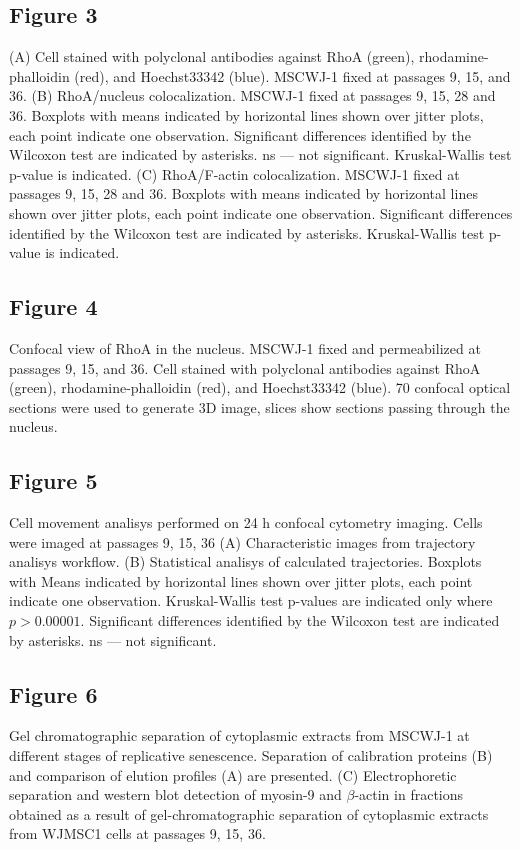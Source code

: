 \documentclass[alpha-refs]{wiley-article}
\begin{document}
\subsection*{Figure 3}
(A) Cell stained with polyclonal antibodies against RhoA (green), rhodamine-phalloidin (red), and Hoechst33342 (blue).
MSCWJ-1 fixed at passages 9, 15, and 36.
(B) RhoA/nucleus colocalization. MSCWJ-1 fixed at passages 9, 15, 28 and 36.
Boxplots with means indicated by horizontal lines shown over jitter plots, each point indicate one observation.
Significant differences identified by the Wilcoxon test are indicated by asterisks.
ns --- not significant.
Kruskal-Wallis test p-value is indicated.
(C) RhoA/F-actin colocalization. MSCWJ-1 fixed at passages 9, 15, 28 and 36.
Boxplots with means indicated by horizontal lines shown over jitter plots, each point indicate one observation.
Significant differences identified by the Wilcoxon test are indicated by asterisks.
Kruskal-Wallis test p-value is indicated.

\subsection*{Figure 4}
Confocal view of RhoA in the nucleus.
MSCWJ-1 fixed and permeabilized at passages 9, 15, and 36.
Cell stained with polyclonal antibodies against RhoA (green), rhodamine-phalloidin (red), and Hoechst33342 (blue).
70 confocal optical sections were used to generate 3D image, slices show sections passing through the nucleus.

\subsection*{Figure 5}
Cell movement analisys performed on 24 h confocal cytometry imaging.
Cells were imaged at passages 9, 15, 36 (A) Characteristic images from trajectory analisys workflow.
(B) Statistical analisys of calculated trajectories.
Boxplots with Means indicated by horizontal lines shown over jitter plots, each point indicate one observation.
Kruskal-Wallis test p-values are indicated only where $p > 0.00001$.
Significant differences identified by the Wilcoxon test are indicated by asterisks.
ns --- not significant.

\subsection*{Figure 6}
Gel chromatographic separation of cytoplasmic extracts from MSCWJ-1 at different stages of replicative senescence.
Separation of calibration proteins (B) and comparison of elution profiles (A) are presented.
(C) Electrophoretic separation and western blot detection of myosin-9 and $\beta$-actin in fractions obtained as a result of gel-chromatographic separation of cytoplasmic extracts from WJMSC1 cells at passages 9, 15, 36.
\end{document}
